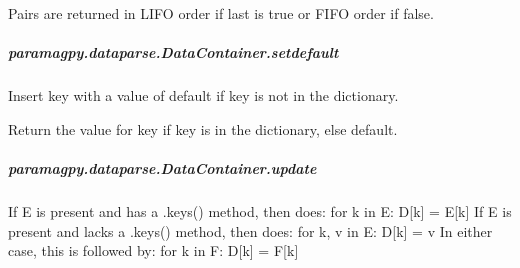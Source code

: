 \documentclass[a4paper,10pt,english,openany,oneside]{sphinxmanual}
\begin{document}
\begin{fulllineitems}
\begin{fulllineitems}
\begin{fulllineitems}
\sphinxAtStartPar
Pairs are returned in LIFO order if last is true or FIFO order if false.

\end{fulllineitems}



\subparagraph{paramagpy.dataparse.DataContainer.setdefault}
\label{\detokenize{reference/generated/paramagpy.dataparse.DataContainer.setdefault:paramagpy-dataparse-datacontainer-setdefault}}\label{\detokenize{reference/generated/paramagpy.dataparse.DataContainer.setdefault::doc}}

\begin{fulllineitems}
\label{\detokenize{reference/generated/paramagpy.dataparse.DataContainer.setdefault:paramagpy.dataparse.DataContainer.setdefault}}
\sphinxAtStartPar
Insert key with a value of default if key is not in the dictionary.

\sphinxAtStartPar
Return the value for key if key is in the dictionary, else default.

\end{fulllineitems}



\subparagraph{paramagpy.dataparse.DataContainer.update}
\label{\detokenize{reference/generated/paramagpy.dataparse.DataContainer.update:paramagpy-dataparse-datacontainer-update}}\label{\detokenize{reference/generated/paramagpy.dataparse.DataContainer.update::doc}}

\begin{fulllineitems}
\label{\detokenize{reference/generated/paramagpy.dataparse.DataContainer.update:paramagpy.dataparse.DataContainer.update}}
\sphinxAtStartPar
If E is present and has a .keys() method, then does:  for k in E: D{[}k{]} = E{[}k{]}
If E is present and lacks a .keys() method, then does:  for k, v in E: D{[}k{]} = v
In either case, this is followed by: for k in F:  D{[}k{]} = F{[}k{]}


\end{fulllineitems}
\end{fulllineitems}
\end{fulllineitems}
\end{document}
